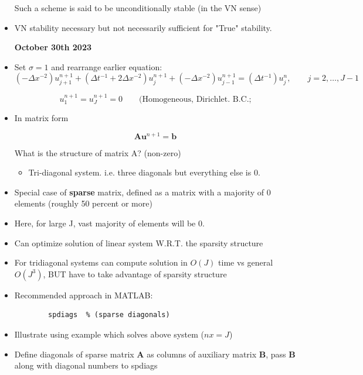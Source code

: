 \begin{itemize}
    Such a scheme is said to be unconditionally stable (in the VN sense)

    \item VN stability necessary but not necessarily sufficient for "True" stability.

    \textbf{October 30th 2023}

    \item Set $\sigma = 1$ and rearrange earlier equation:
    \[ (-\Delta x^{-2}) u_{j+1}^{n+1} + (\Delta t^{-1} + 2 \Delta x^{-2})u_j^{n+1} +(-\Delta x^{-2})u_{j-1}^{n+1} = (\Delta t^{-1}) u_j^n , \qquad j=2,\ldots, J-1 \]

    \[ u_1^{n+1} = u_J^{n+1} = 0 \qquad \text{(Homogeneous, Dirichlet. B.C.;}\]

    \item In matrix form

    \[ \mathbf{A} \mathbf{u}^{n+1} = \mathbf{b}\]

    What is the structure of matrix A? (non-zero)

    \begin{itemize}
        \item Tri-diagonal system. i.e. three diagonals but everything else is 0.
    \end{itemize}

    \item Special case of \textbf{sparse} matrix, defined as a matrix with a majority of 0 elements (roughly 50 percent or more)

    \item Here, for large J, vast majority of elements will be 0.

    \item Can optimize solution of linear system W.R.T. the sparsity structure

    \item For tridiagonal systems can compute solution in $O(J)$ time vs general $O(J^3)$, BUT have to take advantage of sparsity structure

    \item Recommended approach in MATLAB:

    \begin{verbatim}
        spdiags  % (sparse diagonals)
    \end{verbatim}
    \item Illustrate using example which solves above system ($nx=J$)

    \item Define diagonals of sparse matrix $\mathbf{A}$ as columns of auxiliary matrix $\mathbf{B}$, pass $\mathbf{B}$ along with diagonal numbers to spdiags


\end{itemize}
